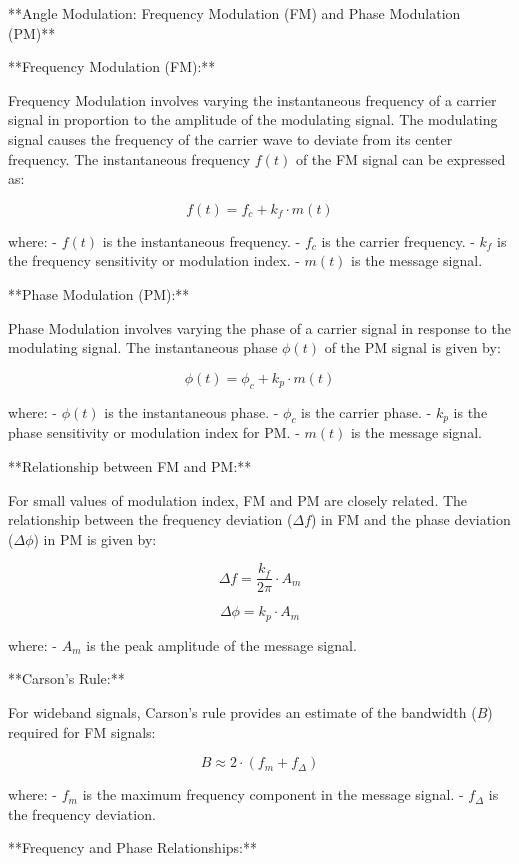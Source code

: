 \documentclass[../../../../DMCC-My-Notebook]{subfiles}
\begin{document}
	\pagebreak
	
	
	**Angle Modulation: Frequency Modulation (FM) and Phase Modulation (PM)**
	
	**Frequency Modulation (FM):**
	
	Frequency Modulation involves varying the instantaneous frequency of a carrier signal in proportion to the amplitude of the modulating signal. The modulating signal causes the frequency of the carrier wave to deviate from its center frequency. The instantaneous frequency \(f(t)\) of the FM signal can be expressed as:
	
	\[ f(t) = f_c + k_f \cdot m(t) \]
	
	where:
	- \( f(t) \) is the instantaneous frequency.
	- \( f_c \) is the carrier frequency.
	- \( k_f \) is the frequency sensitivity or modulation index.
	- \( m(t) \) is the message signal.
	
	**Phase Modulation (PM):**
	
	Phase Modulation involves varying the phase of a carrier signal in response to the modulating signal. The instantaneous phase \(\phi(t)\) of the PM signal is given by:
	
	\[ \phi(t) = \phi_c + k_p \cdot m(t) \]
	
	where:
	- \( \phi(t) \) is the instantaneous phase.
	- \( \phi_c \) is the carrier phase.
	- \( k_p \) is the phase sensitivity or modulation index for PM.
	- \( m(t) \) is the message signal.
	
	**Relationship between FM and PM:**
	
	For small values of modulation index, FM and PM are closely related. The relationship between the frequency deviation (\( \Delta f \)) in FM and the phase deviation (\( \Delta \phi \)) in PM is given by:
	
	\[ \Delta f = \frac{k_f}{2\pi} \cdot A_m \]
	
	\[ \Delta \phi = k_p \cdot A_m \]
	
	where:
	- \( A_m \) is the peak amplitude of the message signal.
	
	**Carson's Rule:**
	
	For wideband signals, Carson's rule provides an estimate of the bandwidth (\(B\)) required for FM signals:
	
	\[ B \approx 2 \cdot (f_m + f_{\Delta}) \]
	
	where:
	- \( f_m \) is the maximum frequency component in the message signal.
	- \( f_{\Delta} \) is the frequency deviation.
	
	**Frequency and Phase Relationships:**
	
\end{document}
